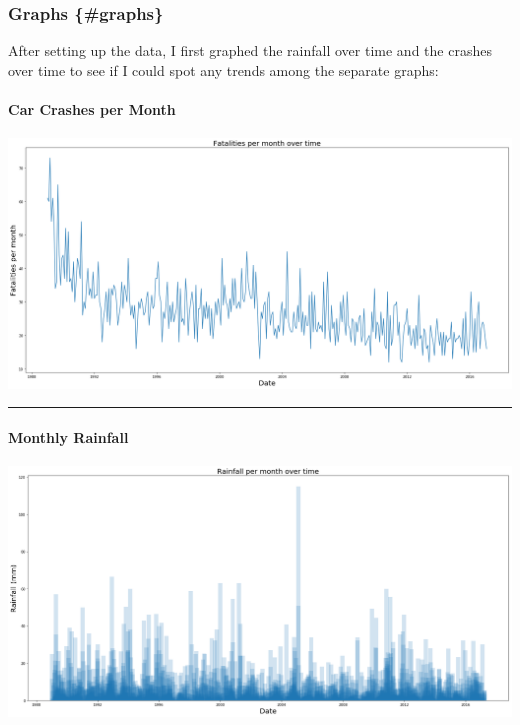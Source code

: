 \documentclass{article}
\begin{document}
\subsubsection{Graphs \{\#graphs\}}\label{graphs-graphs}

After setting up the data, I first graphed the rainfall over time and
the crashes over time to see if I could spot any trends among the
separate graphs:

\paragraph{Car Crashes per Month}\label{car-crashes-per-month}

\href{assets/crashes_over_time.png}{\includegraphics{assets/crashes_over_time.png}}

\begin{center}\rule{0.5\linewidth}{\linethickness}\end{center}

\paragraph{Monthly Rainfall}\label{monthly-rainfall}

\href{assets/rainfall_over_time.png}{\includegraphics{assets/rainfall_over_time.png}}
\end{document}
